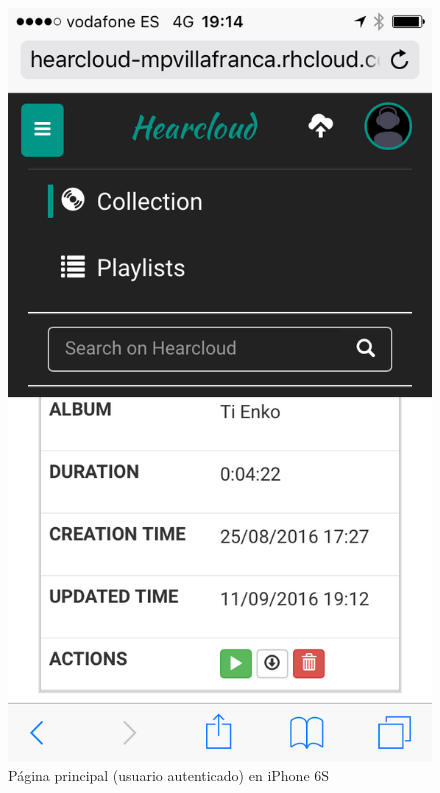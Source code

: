 \begin{figure}[H]
  \includegraphics[width=\linewidth]{../images/um/um_11.png}
  \caption{Página principal (usuario autenticado) en iPhone 6S}
\endminipage\hfill
\end{figure}

\newpage